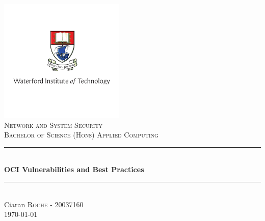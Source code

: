 \begin{titlepage}

\newcommand{\HRule}{\rule{\linewidth}{0.5mm}}

\center

\includegraphics{images/logo.png}\\
\textsc{\Large Network and System Security}\\[0.5cm]
\textsc{\large Bachelor of Science (Hons) Applied Computing }\\[0.5cm] 


\HRule \\[0.4cm]
{ \huge \bfseries OCI Vulnerabilities and Best Practices}\\[0.4cm] 
\HRule \\[1.5cm]

\Large Ciaran \textsc{Roche} - 20037160\\[3cm]


{\large \today}\\[1cm]

\vfill 

\end{titlepage}

